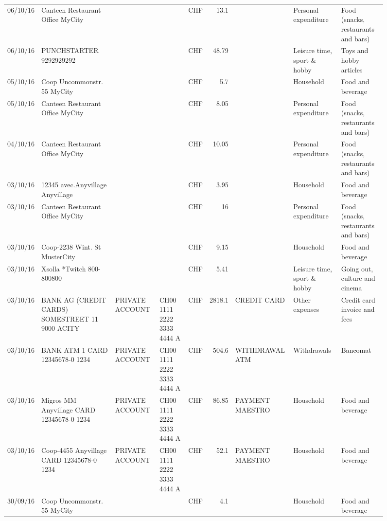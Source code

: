 \begin{landscape}
\begin{sidewaysfigure}
\begin{table}[h]
\begin{center}
\begin{tabular}{rllllrlll}
		06/10/16 & Canteen Restaurant Office      MyCity &       &       & CHF   & 13.1  &       & Personal expenditure & Food (snacks, restaurants and bars) \\
		06/10/16 & PUNCHSTARTER     9292929292 &       &       & CHF   & 48.79 &       & Leisure time, sport \& hobby & Toys and hobby articles \\
		05/10/16 & Coop Uncommonstr. 55   MyCity &       &       & CHF   & 5.7   &       & Household & Food and beverage \\
		05/10/16 & Canteen Restaurant Office      MyCity &       &       & CHF   & 8.05  &       & Personal expenditure & Food (snacks, restaurants and bars) \\
		04/10/16 & Canteen Restaurant Office      MyCity &       &       & CHF   & 10.05 &       & Personal expenditure & Food (snacks, restaurants and bars) \\
		03/10/16 & 12345 avec.Anyvillage   Anyvillage &       &       & CHF   & 3.95  &       & Household & Food and beverage \\
		03/10/16 & Canteen Restaurant Office      MyCity &       &       & CHF   & 16    &       & Personal expenditure & Food (snacks, restaurants and bars) \\
		03/10/16 & Coop-2238 Wint. St       MusterCity &       &       & CHF   & 9.15  &       & Household & Food and beverage \\
		03/10/16 & Xsolla *Twitch           800-800800 &       &       & CHF   & 5.41  &       & Leisure time, sport \& hobby & Going out, culture and cinema \\
		03/10/16 & BANK AG (CREDIT CARDS) SOMESTREET 11 9000 ACITY & PRIVATE ACCOUNT & CH00 1111 2222 3333 4444 A & CHF   & 2818.1 & CREDIT CARD & Other expenses & Credit card invoice and fees \\
		03/10/16 & BANK ATM 1 CARD 12345678-0 1234 & PRIVATE ACCOUNT & CH00 1111 2222 3333 4444 A & CHF   & 504.6 & WITHDRAWAL ATM & Withdrawals & Bancomat \\
		03/10/16 & Migros MM Anyvillage CARD 12345678-0 1234 & PRIVATE ACCOUNT & CH00 1111 2222 3333 4444 A & CHF   & 86.85 & PAYMENT MAESTRO & Household & Food and beverage \\
		03/10/16 & Coop-4455 Anyvillage CARD 12345678-0 1234 & PRIVATE ACCOUNT & CH00 1111 2222 3333 4444 A & CHF   & 52.1  & PAYMENT MAESTRO & Household & Food and beverage \\
		30/09/16 & Coop Uncommonstr. 55   MyCity &       &       & CHF   & 4.1   &       & Household & Food and beverage \\

\end{tabular}
\end{center}
\end{table}
\end{sidewaysfigure}
\end{landscape}
